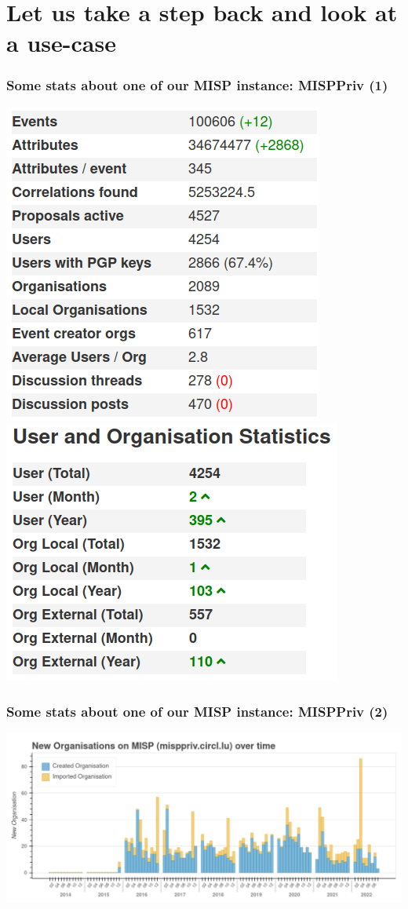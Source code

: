 \section{Let us take a step back and look at a use-case}
\begin{frame}
\frametitle{Some stats about one of our MISP instance: MISPPriv (1)}
    \includegraphics[width=0.45\linewidth]{pictures/misppriv-usage.png}
    \includegraphics[width=0.45\linewidth]{pictures/misppriv-user-org-stats.png}
\end{frame}

\begin{frame}
    \frametitle{Some stats about one of our MISP instance: MISPPriv (2)}
    \begin{center}
        \includegraphics[width=1.0\linewidth]{pictures/bokeh_new_org.png}
    \end{center}
\end{frame}

